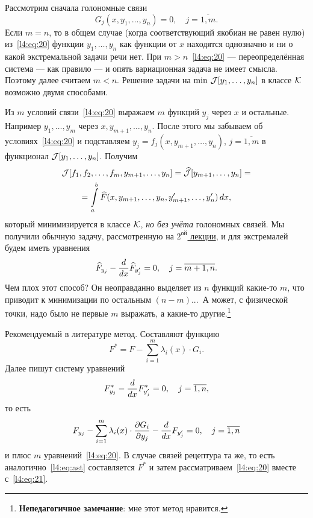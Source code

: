\begin{enumerateD}
	Рассмотрим сначала голономные связи
	\begin{equation}
		\label{l4:eq:20}
		 G_j(x,y_1,\ldots,y_n)=0,\quad j=\overline{1,m}.
	\end{equation}
	Если $m=n$, то в общем случае (когда соответствующий якобиан не равен нулю) из~\eqref{l4:eq:20} функции $y_1,\ldots,y_n$ как функции от $x$ находятся однозначно и ни о какой экстремальной задачи речи нет. При $m>n$~\eqref{l4:eq:20} --- переопределённая система --- как правило --- и опять вариационная задача не имеет смысла. Поэтому далее считаем $m<n$. Решение задачи на $\min\,\mathcal{J}[y_1,\ldots,y_n]$ в классе $\mathcal{K}$ возможно двумя способами. 
	\begin{enumerateD}
		\item Из $m$ условий связи~\eqref{l4:eq:20} выражаем $m$ функций $y_j$ через $x$ и остальные. Например $y_1,\ldots,y_m$ через $x,y_{m+1},\ldots,y_n$. После этого мы забываем об условиях~\eqref{l4:eq:20} и подставляем $y_j=f_j(x,y_{m+1},\ldots,y_{n})$, $j=\overline{1,m}$ в функционал $\mathcal{J}[y_1,\ldots,y_n]$. Получим
		\begin{multline*}
			\mathcal{J}[f_1,f_2,\ldots,f_m,y_{m+1},\ldots,y_n]=\widehat{\mathcal{J}}[y_{m+1},\ldots,y_n]=\\=\int\limits_a^b \widehat{F}(x,y_{m+1},\ldots,y_n,y'_{m+1},\ldots,y'_n)\,dx,
		\end{multline*}  
		который минимизируется в классе $\mathcal{K}$, \emph{но без учёта} голономных связей. Мы получили обычную задачу, рассмотренную на \hyperref[lecture2]{$2^{\text{ой}}$  лекции}, и для экстремалей будем иметь уравнения
		\begin{equation*}
			 \widehat{F}_{y_j}-\frac{d}{dx}\widehat{F}_{y'_j}=0,\quad j=\overline{m+1,n}.
		\end{equation*} 
		Чем плох этот способ? Он неоправданно выделяет из $n$ функций какие-то $m$, что приводит к минимизации по остальным $(n-m)${\mb ...}\  А может{\mb,} с физической точки{\mb,} надо было не первые $m$ выражать, а какие-то другие.\footnote{\textbf{{\mb Непедагогичное} замечание}: мне этот метод нравится.}
		\item Рекомендуемый в литературе метод. Составляют функцию
		\begin{equation}
			\label{l4:eq:ast}
			 F^{\ast}=F-\sum\limits_{i=1}^{m}\lambda_i(x)\cdot G_i.\tag{$\ast$}
		\end{equation} 
		Далее пишут систему уравнений
		\begin{equation}
			\label{l4:eq:21}
			 F^{\ast}_{y_j}-\frac{d}{dx}F^{\ast}_{y'_j}=0,\quad j=\overline{1,n},
		\end{equation}
		то есть 
		\begin{equation*}
			 F_{y_j}-\sum\limits_{i=1}^m\lambda_i(x)\cdot\frac{\partial G_i}{\partial y_j}-\frac{d}{dx}F_{y_j'}=0,\quad j=\overline{1,n}
		\end{equation*}
		и плюс $m$ уравнений~\eqref{l4:eq:20}.
		В случае {} связей рецептура та же, то есть аналогично~\eqref{l4:eq:ast} составляется $	F^{\ast}$ и затем рассматриваем~\eqref{l4:eq:20} вместе с~\eqref{l4:eq:21}.
	\end{enumerateD}
\end{enumerateD}


